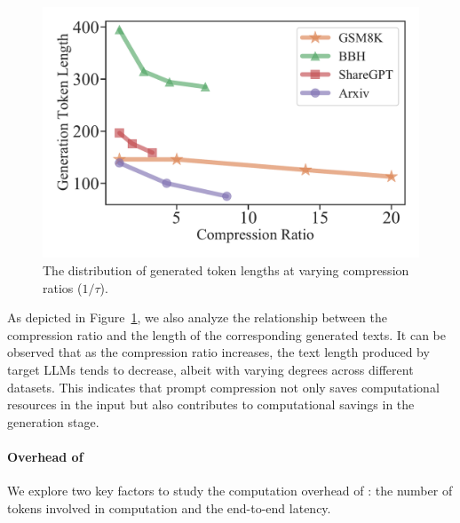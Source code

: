 \begin{figure}[htb]
    \centering
    \includegraphics[width=\linewidth]{figures/compression_ratio_generation_length.pdf}
    \caption{The distribution of generated token lengths at varying compression ratios ($1/\tau$).}
    \label{fig:compression_ratio_vs_generation_length}
\end{figure}

As depicted in Figure~\ref{fig:compression_ratio_vs_generation_length}, we also analyze 
the relationship between the compression ratio and the length of the corresponding generated texts.
It can be observed that as the compression ratio increases, the text length produced by target LLMs tends to decrease, albeit with varying degrees across different datasets. This indicates that prompt compression not only saves computational resources in the input but also contributes to computational savings in the generation stage.


\paragraph{{Overhead of \sysname{}}}

We explore two key factors to study the computation overhead of \sysname{}: the number of tokens involved in computation and the end-to-end latency.

